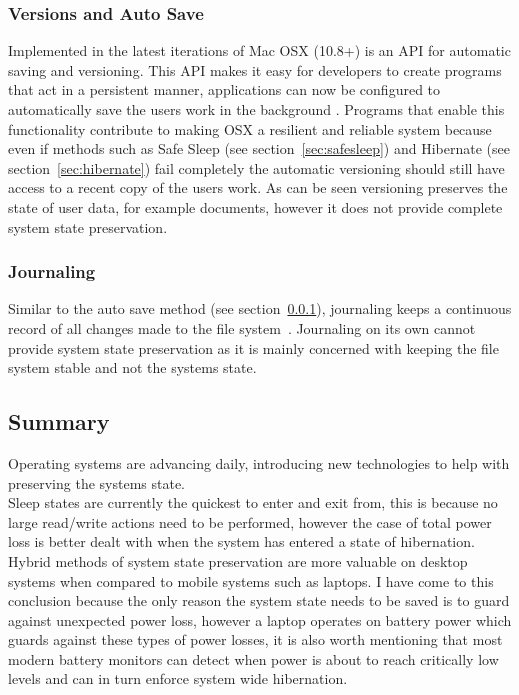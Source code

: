 \documentclass[a4paper,12pt]{article}
\begin{document}
\subsubsection{Versions and Auto Save}\label{sec:versioning}
Implemented in the latest iterations of Mac OSX (10.8+) is an API for automatic saving and versioning. This API makes it easy for developers to create programs that act in a persistent manner, applications can now be configured to automatically save the users work in the background \citep{versioning}. 
Programs that enable this functionality contribute to making OSX a resilient and reliable system because even if methods such as Safe Sleep (see section~\ref{sec:safesleep}) and Hibernate (see section~\ref{sec:hibernate}) fail completely the automatic versioning should still have access to a recent copy of the users work. As can be seen versioning preserves the state of user data, for example documents, however it does not provide complete system state preservation.

\subsubsection{Journaling}
Similar to the auto save method (see section~\ref{sec:versioning}), journaling keeps a continuous record of all changes made to the file system~\citep{journaling}. Journaling on its own cannot provide system  state preservation as it is mainly concerned with keeping the file system stable and not the systems state.
\citep{journaling}
\subsection{Summary}
Operating systems are advancing daily, introducing new technologies to help with preserving the systems state.
\\
Sleep states are currently the quickest to enter and exit from, this is because no large read/write actions need to be performed, however the case of total power loss is better dealt with when the system has entered a state of hibernation. 
\\
Hybrid methods of system state preservation are more valuable on desktop systems when compared to mobile systems such as laptops. I have come to this conclusion because the only reason the system state needs to be saved is to guard against unexpected power loss, however a laptop operates on battery power which guards against these types of power losses, it is also worth mentioning that most modern battery monitors can detect when power is about to reach critically low levels and can in turn enforce system wide hibernation.
\newpage
\end{document}
